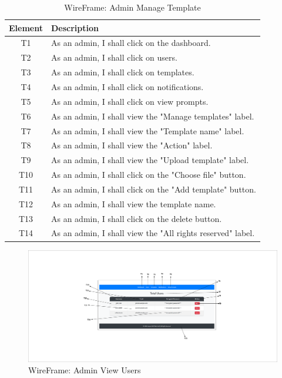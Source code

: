 \documentclass[12pt]{report}
\begin{document}
\begin{table}[h!]
    \centering
    \begin{tabular}{|c|p{10cm}|}
        \hline
        \textbf{Element} & \textbf{Description} \\
        \hline
        T1 & As an admin, I shall click on the dashboard. \\
        \hline
        T2 & As an admin, I shall click on users. \\
        \hline
        T3 & As an admin, I shall click on templates. \\
        \hline
        T4 & As an admin, I shall click on notifications. \\
        \hline
        T5 & As an admin, I shall click on view prompts. \\
        \hline
        T6 & As an admin, I shall view the "Manage templates" label. \\
        \hline
        T7 & As an admin, I shall view the "Template name" label. \\
        \hline
        T8 & As an admin, I shall view the "Action" label. \\
        \hline
        T9 & As an admin, I shall view the "Upload template" label. \\
        \hline
        T10 & As an admin, I shall click on the "Choose file" button. \\
        \hline
        T11 & As an admin, I shall click on the "Add template" button. \\
        \hline
        T12 & As an admin, I shall view the template name. \\
        \hline
        T13 & As an admin, I shall click on the delete button. \\
        \hline
        T14 & As an admin, I shall view the "All rights reserved" label. \\
        \hline
    \end{tabular}
    \caption{WireFrame: Admin Manage Template}
    \label{tab:admin_template_management_actions}
\end{table}
\begin{figure}[ht]
    \centering
    \includegraphics[width=1\textwidth, trim=10cm 5cm 10cm 5cm, clip]{Media/6.pdf} %
    \caption{WireFrame: Admin View Users}
    \label{fig:drawing1}
\end{figure}
\end{document}
